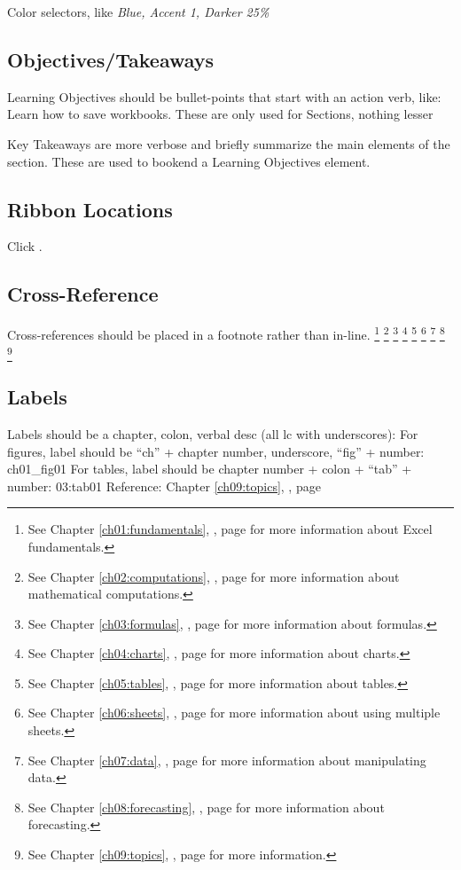 \begin{enumerate}[resume]
  Color selectors, like \textit{Blue, Accent 1, Darker 25\%}

\subsection{Objectives/Takeaways}

Learning Objectives should be bullet-points that start with an action verb, like: Learn how to save workbooks. These are only used for Sections, nothing lesser

Key Takeaways are more verbose and briefly summarize the main elements of the section. These are used to bookend a Learning Objectives element.

\subsection{Ribbon Locations}
Click .

\subsection{Cross-Reference}
Cross-references should be placed in a footnote rather than in-line.
\footnote{See Chapter \ref{ch01:fundamentals}, , page \pageref{ch01:fundamentals} for more information about Excel fundamentals.}
\footnote{See Chapter \ref{ch02:computations}, , page \pageref{ch02:computations} for more information about mathematical computations.}
\footnote{See Chapter \ref{ch03:formulas}, , page \pageref{ch03:formulas} for more information about formulas.}
\footnote{See Chapter \ref{ch04:charts}, , page \pageref{ch04:charts} for more information about charts.}
\footnote{See Chapter \ref{ch05:tables}, , page \pageref{ch05:tables} for more information about tables.}
\footnote{See Chapter \ref{ch06:sheets}, , page \pageref{ch06:sheets} for more information about using multiple sheets.}
\footnote{See Chapter \ref{ch07:data}, , page \pageref{ch07:data} for more information about manipulating data.}
\footnote{See Chapter \ref{ch08:forecasting}, , page \pageref{ch08:forecasting} for more information about forecasting.}
\footnote{See Chapter \ref{ch09:topics}, , page \pageref{ch09:topics} for more information.}

\subsection{Labels}
Labels should be a chapter, colon, verbal desc (all lc with underscores): \label{03:title}
For figures, label should be ``ch'' + chapter number, underscore, ``fig'' + number: ch01_fig01
For tables, label should be chapter number + colon + ``tab'' + number: 03:tab01
Reference: Chapter \ref{ch09:topics}, , page \pageref{ch09:topics}


\end{enumerate}
